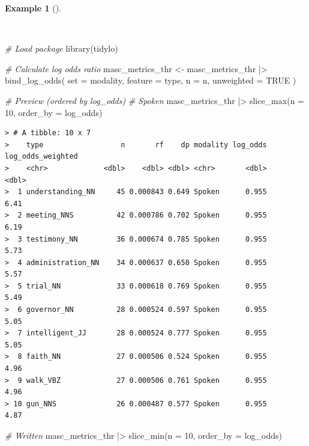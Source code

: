 \documentclass[
  letterpaper,
  DIV=11,
  numbers=noendperiod]{scrreport}
\newenvironment{Shaded}{\begin{snugshade}}{\end{snugshade}}
\newcommand{\AttributeTok}[1]{\textcolor[rgb]{0.00,0.00,0.00}{#1}}
\newcommand{\CommentTok}[1]{\textcolor[rgb]{0.00,0.00,0.00}{\textit{#1}}}
\newcommand{\ConstantTok}[1]{\textcolor[rgb]{0.00,0.00,0.00}{#1}}
\newcommand{\DecValTok}[1]{\textcolor[rgb]{0.00,0.00,0.00}{#1}}
\newcommand{\FunctionTok}[1]{\textcolor[rgb]{0.00,0.00,0.00}{#1}}
\newcommand{\NormalTok}[1]{\textcolor[rgb]{0.00,0.00,0.00}{#1}}
\newcommand{\OtherTok}[1]{\textcolor[rgb]{0.00,0.00,0.00}{#1}}
\newcommand{\SpecialCharTok}[1]{\textcolor[rgb]{0.00,0.00,0.00}{#1}}
\theoremstyle{definition}
\newtheorem{example}{Example}[chapter]
\theoremstyle{remark}
\begin{document}
\begin{example}[]\protect\hypertarget{exm-eda-masc-log-odds}{}\label{exm-eda-masc-log-odds}

~

\begin{Shaded}
\begin{Highlighting}[]
\CommentTok{\# Load package}
\FunctionTok{library}\NormalTok{(tidylo)}

\CommentTok{\# Calculate log odds ratio}
\NormalTok{masc\_metrics\_thr }\OtherTok{\textless{}{-}} 
\NormalTok{  masc\_metrics\_thr }\SpecialCharTok{|\textgreater{}} 
  \FunctionTok{bind\_log\_odds}\NormalTok{(}
    \AttributeTok{set =}\NormalTok{ modality,}
    \AttributeTok{feature =}\NormalTok{ type,}
    \AttributeTok{n =}\NormalTok{ n, }
    \AttributeTok{unweighted =} \ConstantTok{TRUE}
\NormalTok{  )}

\CommentTok{\# Preview (ordered by log\_odds)}
\CommentTok{\# Spoken}
\NormalTok{masc\_metrics\_thr }\SpecialCharTok{|\textgreater{}} 
  \FunctionTok{slice\_max}\NormalTok{(}\AttributeTok{n =} \DecValTok{10}\NormalTok{, }\AttributeTok{order\_by =}\NormalTok{ log\_odds)}
\end{Highlighting}
\end{Shaded}

\begin{verbatim}
> # A tibble: 10 x 7
>    type                  n       rf    dp modality log_odds log_odds_weighted
>    <chr>             <dbl>    <dbl> <dbl> <chr>       <dbl>             <dbl>
>  1 understanding_NN     45 0.000843 0.649 Spoken      0.955              6.41
>  2 meeting_NNS          42 0.000786 0.702 Spoken      0.955              6.19
>  3 testimony_NN         36 0.000674 0.785 Spoken      0.955              5.73
>  4 administration_NN    34 0.000637 0.650 Spoken      0.955              5.57
>  5 trial_NN             33 0.000618 0.769 Spoken      0.955              5.49
>  6 governor_NN          28 0.000524 0.597 Spoken      0.955              5.05
>  7 intelligent_JJ       28 0.000524 0.777 Spoken      0.955              5.05
>  8 faith_NN             27 0.000506 0.524 Spoken      0.955              4.96
>  9 walk_VBZ             27 0.000506 0.761 Spoken      0.955              4.96
> 10 gun_NNS              26 0.000487 0.577 Spoken      0.955              4.87
\end{verbatim}

\begin{Shaded}
\begin{Highlighting}[]
\CommentTok{\# Written}
\NormalTok{masc\_metrics\_thr }\SpecialCharTok{|\textgreater{}} 
  \FunctionTok{slice\_min}\NormalTok{(}\AttributeTok{n =} \DecValTok{10}\NormalTok{, }\AttributeTok{order\_by =}\NormalTok{ log\_odds)}
\end{Highlighting}
\end{Shaded}


\end{example}
\end{document}
